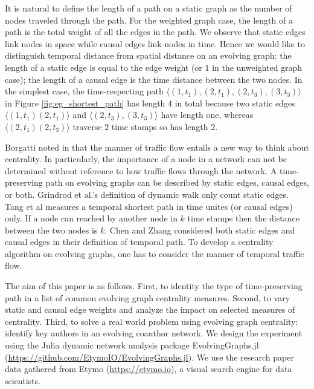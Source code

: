 \documentclass[12pt]{article}
\theoremstyle{definition}
\begin{document}
It is natural to define the length of a path on a static graph as the number of nodes traveled through the path. For the weighted graph case, the length of a path is the total weight of all the edges in the path. We observe that static edges link nodes in space while causal edges link nodes in time. Hence we would like to distinguish temporal distance from spatial distance on an evolving graph: the length of a static edge is equal to the edge weight (or $1$ in the unweighted graph case); the length of a causal edge is the time distance between the two nodes. In the simplest case, the time-respecting path
$\langle (1, t_1) ,(2, t_1) , (2, t_3), (3, t_3)\rangle$ in Figure \ref{fig:eg_shortest_path} has length $4$ in total because two static edges $\langle (1, t_1) (2, t_1) \rangle$ and $\langle (2, t_3), (3, t_3) \rangle$ have length one, whereas $\langle (2, t_1) (2, t_3) \rangle$ traverse $2$ time stamps so has length $2$.



Borgatti noted in \cite{borgatti05} that the manner of traffic flow entails a new way to think about centrality. In particularly, the importance of a node in a network can not be determined without reference to how traffic flows through the network. A time-preserving path on evolving graphs can be described by static edges, causal edges, or both.
Grindrod et al.'s definition of dynamic walk \cite{grindrod11} only count static edges. 
Tang et al \cite{tang10s} measures a temporal shortest path in time unites (or causal edges) only. If a node can reached by another node in $k$ time stamps then the distance between the two nodes is $k$. Chen and Zhang \cite{chen16} considered both static edges and causal edges in their definition of temporal path. 
To develop a centrality algorithm on evolving graphs, one has to consider the manner of temporal traffic flow.  

The aim of this paper is as follows. First, to identity the type of time-preserving path in a list of common evolving graph centrality measures. Second, to vary static and causal edge weights and analyze the impact on selected measures of centrality.
Third, to solve a real world problem using evolving graph centrality: identify key authors in an evolving coauthor network. 
We design the experiment using the Julia dynamic network analysis package
EvolvingGraphs.jl (\url{https://github.com/EtymoIO/EvolvingGraphs.jl}).
We use the research paper data gathered from Etymo (\url{https://etymo.io}), a visual search engine for data scientists.
\end{document}
